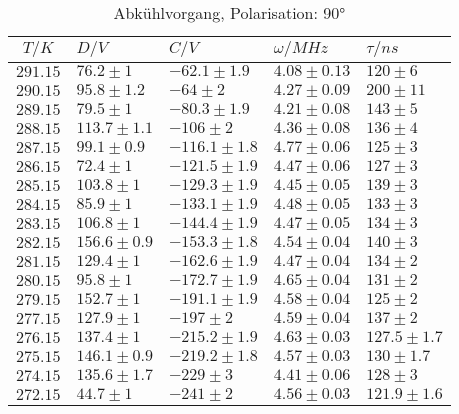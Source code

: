 \begin{table}[h!]
\scriptsize\centering
\begin{tabular}{|c|l|l|l|l|}
\hline
$T/K$&$D/V$&$C/V$&$\omega/MHz$&$\tau/ns$\\\hline\hline
$291.15$&$76.2\pm1$&$-62.1\pm1.9$&$4.08\pm0.13$&$120\pm6$\\\hline
$290.15$&$95.8\pm1.2$&$-64\pm2$&$4.27\pm0.09$&$200\pm11$\\\hline
$289.15$&$79.5\pm1$&$-80.3\pm1.9$&$4.21\pm0.08$&$143\pm5$\\\hline
$288.15$&$113.7\pm1.1$&$-106\pm2$&$4.36\pm0.08$&$136\pm4$\\\hline
$287.15$&$99.1\pm0.9$&$-116.1\pm1.8$&$4.77\pm0.06$&$125\pm3$\\\hline
$286.15$&$72.4\pm1$&$-121.5\pm1.9$&$4.47\pm0.06$&$127\pm3$\\\hline
$285.15$&$103.8\pm1$&$-129.3\pm1.9$&$4.45\pm0.05$&$139\pm3$\\\hline
$284.15$&$85.9\pm1$&$-133.1\pm1.9$&$4.48\pm0.05$&$133\pm3$\\\hline
$283.15$&$106.8\pm1$&$-144.4\pm1.9$&$4.47\pm0.05$&$134\pm3$\\\hline
$282.15$&$156.6\pm0.9$&$-153.3\pm1.8$&$4.54\pm0.04$&$140\pm3$\\\hline
$281.15$&$129.4\pm1$&$-162.6\pm1.9$&$4.47\pm0.04$&$134\pm2$\\\hline
$280.15$&$95.8\pm1$&$-172.7\pm1.9$&$4.65\pm0.04$&$131\pm2$\\\hline
$279.15$&$152.7\pm1$&$-191.1\pm1.9$&$4.58\pm0.04$&$125\pm2$\\\hline
$277.15$&$127.9\pm1$&$-197\pm2$&$4.59\pm0.04$&$137\pm2$\\\hline
$276.15$&$137.4\pm1$&$-215.2\pm1.9$&$4.63\pm0.03$&$127.5\pm1.7$\\\hline
$275.15$&$146.1\pm0.9$&$-219.2\pm1.8$&$4.57\pm0.03$&$130\pm1.7$\\\hline
$274.15$&$135.6\pm1.7$&$-229\pm3$&$4.41\pm0.06$&$128\pm3$\\\hline
$272.15$&$44.7\pm1$&$-241\pm2$&$4.56\pm0.03$&$121.9\pm1.6$\\\hline
\end{tabular}
\caption{Abkühlvorgang, Polarisation: 90°\label{cold90}}
\end{table}
